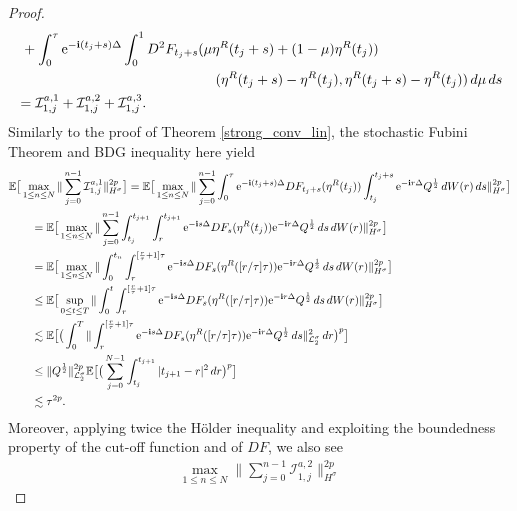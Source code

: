 \documentclass[a4paper]{amsart}
\begin{document}
\begin{proof}
\begin{align*}
        &\ +\int_0^\tau {\rm e}^{-{\bf i}(t_j+s)\Delta} \int_0^1 D^2 F_{t_j+s}(\mu \eta^R(t_j+s)+(1-\mu)\eta^R(t_j))\\
        &\hspace{5cm}(\eta^R(t_j+s)-\eta^R(t_j),\eta^R(t_j+s)-\eta^R(t_j))\,d\mu \,ds\\
        &=\mathcal{I}_{1,j}^{a,1}+\mathcal{I}_{1,j}^{a,2}+\mathcal{I}_{1,j}^{a,3}.
    \end{align*}
    Similarly to the proof of Theorem \ref{strong_conv_lin}, the stochastic Fubini Theorem and BDG inequality here yield
    \begin{align*}
       &\mathbb{E}\big[\max_{1\le n\le N}\|\sum_{j=0}^{n-1} \mathcal{I}_{1,j}^{a,1}\|^{2p}_{H^\sigma}\big]= \mathbb{E}\big[\max_{1\le n\le N}\|\sum_{j=0}^{n-1}\int_0^\tau {\rm e}^{-{\bf i}(t_j+s)\Delta} DF_{t_j+s}(\eta^R(t_j)) \int_{t_j}^{t_j+s}{\rm e}^{-{\bf i}r\Delta}Q^{\frac{1}{2}}\,dW(r)\,ds \|^{2p}_{H^\sigma}\big]\\
       &\qquad =\mathbb{E}\big[\max_{1\le n\le N}\|\sum_{j=0}^{n-1}\int_{t_j}^{t_{j+1}}\int_{r}^{t_{j+1}} {\rm e}^{-{\bf i}s\Delta} DF_{s}(\eta^R(t_j)) {\rm e}^{-{\bf i}r\Delta}Q^{\frac{1}{2}}\,ds\,dW(r) \|^{2p}_{H^\sigma}\big]\\
       &\qquad =\mathbb{E}\big[\max_{1\le n\le N}\|\int_{0}^{t_{n}}\int_{r}^{[\frac{r}{\tau}+1]\tau} {\rm e}^{-{\bf i}s\Delta} DF_{s}(\eta^R([r/\tau]\tau)) {\rm e}^{-{\bf i}r\Delta}Q^{\frac{1}{2}}\,ds\,dW(r) \|^{2p}_{H^\sigma}\big]\\
       &\qquad \le \mathbb{E}\big[\sup_{0\le t\le T}\|\int_{0}^{t}\int_{r}^{[\frac{r}{\tau}+1]\tau} {\rm e}^{-{\bf i}s\Delta} DF_{s}(\eta^R([r/\tau]\tau)) {\rm e}^{-{\bf i}r\Delta}Q^{\frac{1}{2}}\,ds\,dW(r) \|^{2p}_{H^\sigma}\big]\\
       &\qquad \lesssim \mathbb{E}\big[\big(\int_0^T \|\int_r^{[\frac{r}{\tau}+1]\tau}{\rm e}^{-{\bf i}s\Delta} DF_{s}(\eta^R([r/\tau]\tau)) {\rm e}^{-{\bf i}r\Delta} Q^{\frac{1}{2}}\,ds \|_{\mathcal{L}_2^\sigma}^2\,dr\big)^p\big]\\
       &\qquad \le \|Q^{\frac{1}{2}}\|_{\mathcal{L}_2^\sigma}^{2p} \mathbb{E}\big[\big(\sum_{j=0}^{N-1} \int_{t_j}^{t_{j+1}}|t_{j+1}-r|^2\,dr\big)^p\big]\\
       &\qquad \lesssim \tau^{2p}.
    \end{align*}
    Moreover, applying twice the Hölder inequality and exploiting the boundedness property of the cut-off function and of $DF$, we also see
    \begin{align*}
        \max_{1\le n\le N}\|\sum_{j=0}^{n-1} \mathcal{I}_{1,j}^{a,2}\|^{2p}_{H^\sigma}

\end{align*}
\end{proof}
\end{document}

